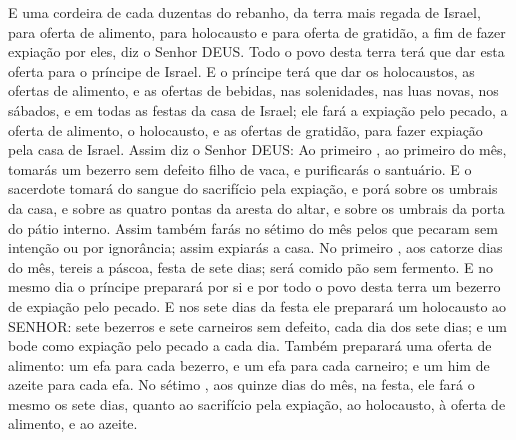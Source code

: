 {E uma cordeira de cada duzentas do rebanho, da terra mais regada de Israel, para oferta de alimento, para holocausto e para oferta de gratidão, a fim de fazer expiação por eles, diz o Senhor DEUS.
Todo o povo desta terra terá que dar esta oferta para o príncipe de Israel.
E o príncipe terá que dar os holocaustos, as ofertas de alimento, e as ofertas de bebidas, nas solenidades, nas luas novas, nos sábados, e em todas as festas da casa de Israel; ele fará a expiação pelo pecado, a oferta de alimento, o holocausto, e as ofertas de gratidão, para fazer expiação pela casa de Israel.
Assim diz o Senhor DEUS: Ao primeiro
{} , ao primeiro
{} do mês, tomarás um bezerro sem defeito filho de vaca, e purificarás o santuário.
E o sacerdote tomará do sangue do sacrifício pela expiação, e porá
{} sobre os umbrais da casa, e sobre as quatro pontas da aresta do altar, e sobre os umbrais da porta do pátio interno.
Assim também farás no sétimo
{} do mês pelos que pecaram sem intenção ou por ignorância; assim expiarás a casa.
No primeiro
{} , aos catorze dias do mês, tereis a páscoa, festa de sete dias; será comido pão sem fermento.
E no mesmo dia o príncipe preparará por si e por todo o povo desta terra um bezerro de expiação pelo pecado.
E nos sete dias da festa ele preparará um holocausto ao SENHOR: sete bezerros e sete carneiros sem defeito, cada dia dos sete dias; e um bode como expiação pelo pecado a cada dia.
Também preparará uma oferta de alimento: um efa para cada bezerro, e um efa para cada carneiro; e um him de azeite para cada efa.
No sétimo
{} , aos quinze dias do mês, na festa, ele fará o mesmo
{} os sete dias, quanto ao sacrifício pela expiação, ao holocausto, à oferta de alimento, e ao azeite.

}
